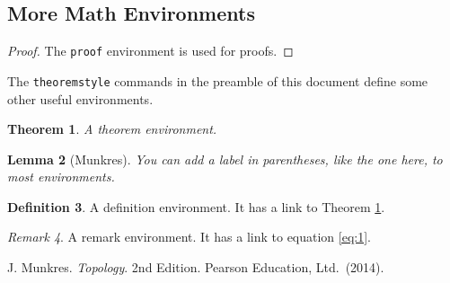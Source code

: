 \documentclass[a4paper,10pt,leqno]{article}
\numberwithin{equation}{section}
\theoremstyle{plain}
\newtheorem{thm}{Theorem}[section]
\newtheorem{lem}[thm]{Lemma}
\theoremstyle{definition}
\newtheorem{df}[thm]{Definition}
\theoremstyle{remark}
\newtheorem{rem}[thm]{Remark}
\begin{document}
\subsection{More Math Environments} 

\begin{proof} 
The \texttt{proof} environment is used for proofs.
\end{proof} 

The \texttt{theoremstyle} commands in the preamble of this document define some other useful environments.

\begin{thm}\label{thm:1}
A theorem environment.
\end{thm}

\begin{lem}[Munkres]
You can add a label in parentheses, like the one here, to most environments.
\end{lem}

\begin{df}
A definition environment.
It has a link to Theorem \ref{thm:1}.
\end{df}

\begin{rem}
A remark environment.
It has a link to equation \eqref{eq:1}.
\end{rem}


\frenchspacing
\begin{thebibliography}{11}
	J. Munkres.
	\textsl{Topology}.
	2nd Edition.
	Pearson Education, Ltd.\ (2014).
	
	
\end{thebibliography}
\end{document}
